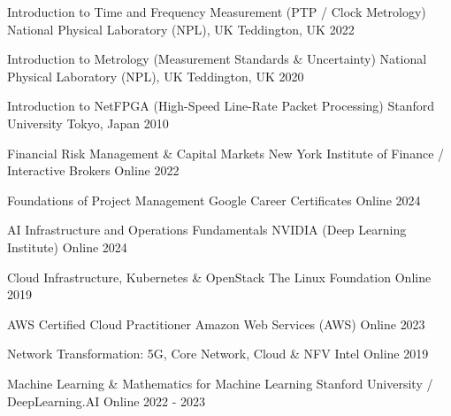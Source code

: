 

\begin{cvhonors}

  \cvhonor
    {Introduction to Time and Frequency Measurement (PTP / Clock Metrology)} %
    {National Physical Laboratory (NPL), UK} %
    {Teddington, UK} %
    {2022} %

  \cvhonor
    {Introduction to Metrology (Measurement Standards \& Uncertainty)} %
    {National Physical Laboratory (NPL), UK} %
    {Teddington, UK} %
    {2020} %

  \cvhonor
    {Introduction to NetFPGA (High-Speed Line-Rate Packet Processing)} %
    {Stanford University} %
    {Tokyo, Japan} %
    {2010} %

  \cvhonor
    {Financial Risk Management \& Capital Markets} %
    {New York Institute of Finance / Interactive Brokers} %
    {Online} %
    {2022} %

  \cvhonor
    {Foundations of Project Management} %
    {Google Career Certificates} %
    {Online} %
    {2024} %

  \cvhonor
    {AI Infrastructure and Operations Fundamentals} %
    {NVIDIA (Deep Learning Institute)} %
    {Online} %
    {2024} %

  \cvhonor
    {Cloud Infrastructure, Kubernetes \& OpenStack} %
    {The Linux Foundation} %
    {Online} %
    {2019} %

  \cvhonor
    {AWS Certified Cloud Practitioner} %
    {Amazon Web Services (AWS)} %
    {Online} %
    {2023} %

  \cvhonor
    {Network Transformation: 5G, Core Network, Cloud \& NFV} %
    {Intel} %
    {Online} %
    {2019} %

  \cvhonor
    {Machine Learning \& Mathematics for Machine Learning} %
    {Stanford University / DeepLearning.AI} %
    {Online} %
    {2022 - 2023} %

\end{cvhonors}
